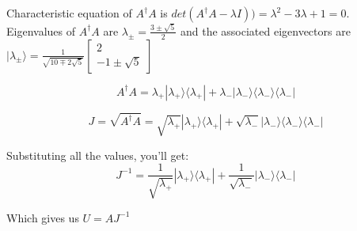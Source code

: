 Characteristic equation of $A^{\dagger}A$ is $det(A^{\dagger} A - \lambda I)) = \lambda^2 - 3 \lambda + 1 = 0$. Eigenvalues of $A^{\dagger}A$ are $\lambda_{\pm} = \frac{3\pm \sqrt{5}}{2}$ and the associated eigenvectors are $|\lambda_{\pm} \rangle = \frac{1}{\sqrt{10 \mp 2\sqrt{5}}} \begin{bmatrix}
    2 \\ -1 \pm \sqrt{5}
\end{bmatrix}$

$$ A^{\dagger}A = \lambda_{+} |\lambda_{+} \rangle \langle \lambda_{+}| + \lambda_{-} |\lambda_{-}\rangle \langle \lambda_{-} \rangle \langle \lambda_{-}|$$

$$ J = \sqrt{A^{\dagger}A} = \sqrt{\lambda_{+}} |\lambda_{+} \rangle \langle \lambda_{+}| + \sqrt{\lambda_{-}} |\lambda_{-}\rangle \langle \lambda_{-} \rangle \langle \lambda_{-}|$$

Substituting all the values, you'll get:
$$J^{-1} = \frac{1}{\sqrt{\lambda_{+}}} |\lambda_{+} \rangle \langle \lambda_{+}| + \frac{1}{\sqrt{\lambda_{-}}} |\lambda_{-} \rangle \langle \lambda_{-}|$$

Which gives us $U = AJ^{-1}$

